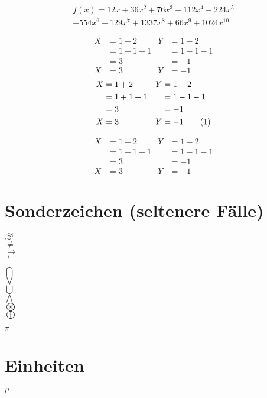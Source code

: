\documentclass{scrarticle}
\begin{document}
	\begin{multline*}
		f(x) = 12x + 36x^2 + 76x^3 + 112x^4 + 224x^5\\
		 + 554x^6 + 129x^7 + 1337x^8 + 66x^9 + 1024x^{10}
	\end{multline*}

	\begin{align}
		 X &= 1 + 2 		& Y  	 &= 1 - 2	\\
		   &= 1 + 1 + 1 	&	 &= 1 - 1 - 1	\\
		   &= 3 		&	 &= -1		\\
		 X &= 3 		& Y  	 &= -1  
	\end{align}
	\newcommand\numberthis{\addtocounter{equation}{1}\tag{\theequation}} %
	\begin{align*}
		X	&= 1 + 2 		& Y 	&= 1 - 2	\\
			&= 1 + 1 + 1 		& 	&= 1 - 1 - 1	\\
			&= 3 			& 	&= -1		\\
		X	&= 3 			& Y 	&= -1 		\numberthis
	\end{align*}

	\begin{align}
		X	&= 1 + 2 		& Y 	&= 1 - 2	\nonumber \\
			&= 1 + 1 + 1 		& 	&= 1 - 1 - 1	\nonumber \\
			&= 3 			& 	&= -1		\nonumber \\
		X	&= 3 			& Y 	&= -1	
	\end{align}

	\newpage

	\section{Sonderzeichen (seltenere Fälle)}
	$\approx$ \\
	$\sim$ \\
	$\neq$ \\
	$\rightarrow$ \\
	$\leftarrow$
	
	\vspace*{1cm}
	\noindent
	$\bigcap$ \\
	$\bigvee$ \\
	$\bigcup$ \\
	$\bigwedge$ \\
	$\bigotimes$ \\
	$\bigoplus$
	
	\vspace*{1cm}
	\noindent
	
	$\pi$
	\section{Einheiten}
	$\mu$ %
\end{document}
